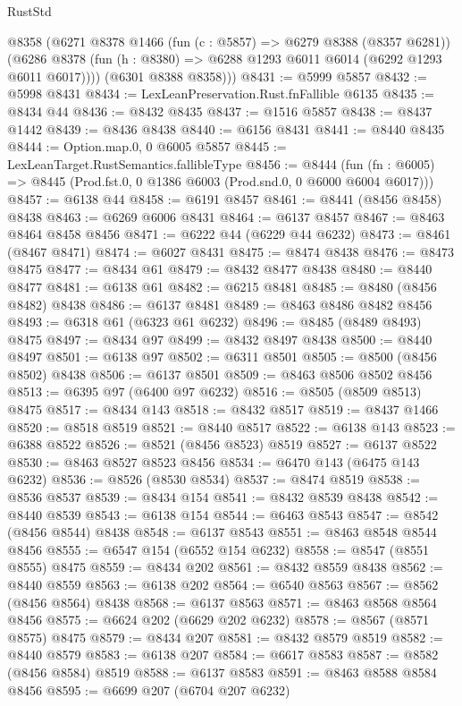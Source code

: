\begin{lexlean}{RustStd}
\begin{coremodule}
{{        @8358
        (@6271
          @8378
          @1466
          (fun (c : @5857) => @6279 @8388 (@8357 @6281))
          (@6286 @8378 (fun (h : @8380) => @6288 @1293 @6011 @6014 (@6292 @1293 @6011 @6017))))
        (@6301 @8388 @8358)))
@8431 := @5999 @5857
@8432 := @5998 @8431
@8434 := LexLeanPreservation.Rust.fnFallible @6135
@8435 := @8434 @44
@8436 := @8432 @8435
@8437 := @1516 @5857
@8438 := @8437 @1442
@8439 := @8436 @8438
@8440 := @6156 @8431
@8441 := @8440 @8435
@8444 := Option.map.{0, 0} @6005 @5857
@8445 := LexLeanTarget.RustSemantics.fallibleType
@8456 := @8444
    (fun (fn : @6005) => @8445 (Prod.fst.{0, 0} @1386 @6003 (Prod.snd.{0, 0} @6000 @6004 @6017)))
@8457 := @6138 @44
@8458 := @6191 @8457
@8461 := @8441 (@8456 @8458) @8438
@8463 := @6269 @6006 @8431
@8464 := @6137 @8457
@8467 := @8463 @8464 @8458 @8456
@8471 := @6222 @44 (@6229 @44 @6232)
@8473 := @8461 (@8467 @8471)
@8474 := @6027 @8431
@8475 := @8474 @8438
@8476 := @8473 @8475
@8477 := @8434 @61
@8479 := @8432 @8477 @8438
@8480 := @8440 @8477
@8481 := @6138 @61
@8482 := @6215 @8481
@8485 := @8480 (@8456 @8482) @8438
@8486 := @6137 @8481
@8489 := @8463 @8486 @8482 @8456
@8493 := @6318 @61 (@6323 @61 @6232)
@8496 := @8485 (@8489 @8493) @8475
@8497 := @8434 @97
@8499 := @8432 @8497 @8438
@8500 := @8440 @8497
@8501 := @6138 @97
@8502 := @6311 @8501
@8505 := @8500 (@8456 @8502) @8438
@8506 := @6137 @8501
@8509 := @8463 @8506 @8502 @8456
@8513 := @6395 @97 (@6400 @97 @6232)
@8516 := @8505 (@8509 @8513) @8475
@8517 := @8434 @143
@8518 := @8432 @8517
@8519 := @8437 @1466
@8520 := @8518 @8519
@8521 := @8440 @8517
@8522 := @6138 @143
@8523 := @6388 @8522
@8526 := @8521 (@8456 @8523) @8519
@8527 := @6137 @8522
@8530 := @8463 @8527 @8523 @8456
@8534 := @6470 @143 (@6475 @143 @6232)
@8536 := @8526 (@8530 @8534)
@8537 := @8474 @8519
@8538 := @8536 @8537
@8539 := @8434 @154
@8541 := @8432 @8539 @8438
@8542 := @8440 @8539
@8543 := @6138 @154
@8544 := @6463 @8543
@8547 := @8542 (@8456 @8544) @8438
@8548 := @6137 @8543
@8551 := @8463 @8548 @8544 @8456
@8555 := @6547 @154 (@6552 @154 @6232)
@8558 := @8547 (@8551 @8555) @8475
@8559 := @8434 @202
@8561 := @8432 @8559 @8438
@8562 := @8440 @8559
@8563 := @6138 @202
@8564 := @6540 @8563
@8567 := @8562 (@8456 @8564) @8438
@8568 := @6137 @8563
@8571 := @8463 @8568 @8564 @8456
@8575 := @6624 @202 (@6629 @202 @6232)
@8578 := @8567 (@8571 @8575) @8475
@8579 := @8434 @207
@8581 := @8432 @8579 @8519
@8582 := @8440 @8579
@8583 := @6138 @207
@8584 := @6617 @8583
@8587 := @8582 (@8456 @8584) @8519
@8588 := @6137 @8583
@8591 := @8463 @8588 @8584 @8456
@8595 := @6699 @207 (@6704 @207 @6232)
}}
\end{coremodule}
\end{lexlean}
